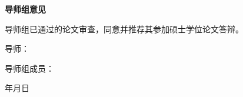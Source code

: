 %
{{\QAUkaiTitle\bfseries\fontsize{16bp}{48bp}\selectfont 导师组意见}}%
\label{chap:opinion}

{\kaishu\fontsize{14bp}{21bp}\selectfont
	导师组已通过\QAUcoverlineKai[2.8cm]{\qauauthor}的论文审查，同意并推荐其参加硕士学位论文答辩。\par}

\vspace{5.8cm}

{\kaishu{}\noindent\hspace*{8.2cm}导\hspace{2.2em}师：\par}

\vspace{1.25cm}

{\kaishu{}\noindent\hspace*{8.2cm}导师组成员：\par}

\vspace{3.25cm}

\begin{flushright}
	\kaishu{}年\hspace{2.8em}月\hspace{2.8em}日\hspace*{1.5cm}
\end{flushright}